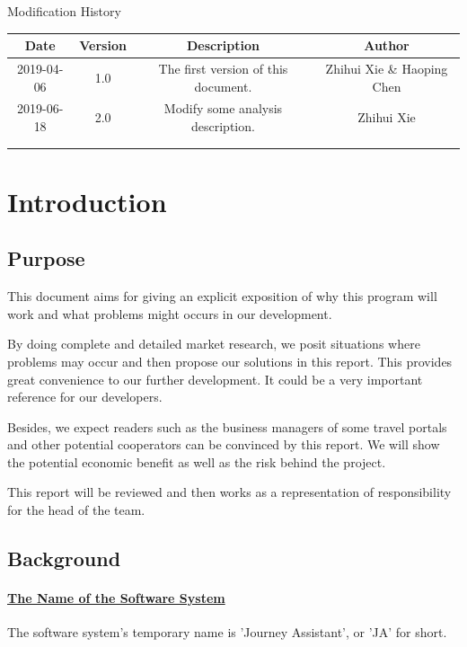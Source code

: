 \documentclass[10pt]{article}
\begin{document}
\newpage

\begin{center}
    {\LARGE Modification History}
    
    \begin{tabular}{|c|c|c|c|} 
        \hline 
        Date&Version&Description&Author\\
        \hline  
        2019-04-06&1.0&The first version of this document.&Zhihui Xie \& Haoping Chen\\
		\hline 
    2019-06-18&2.0&Modify some analysis description.&Zhihui Xie\\
		\hline
		& & & \\
		\hline
		& & & \\
		\hline
    \end{tabular}    
\end{center}

\newpage

\tableofcontents
\newpage


\section{Introduction}
\subsection{Purpose}
This document aims for giving an explicit exposition of why this program will work and what problems might occurs in our development. 

By doing complete and detailed market research, we posit situations where problems may occur and then propose our solutions in this report. This provides great convenience to our further development. It could be a very important reference for our developers. 

Besides, we expect readers such as the business managers of some travel portals and other potential cooperators can be convinced by this report. We will show the potential economic benefit as well as the risk behind the project.

This report will be reviewed and then works as a representation of responsibility for the head of the team.
\subsection{Background}
\paragraph{\underline{The Name of the Software System}}
The software system's temporary name is 'Journey Assistant', or 'JA' for short. 
\end{document}
